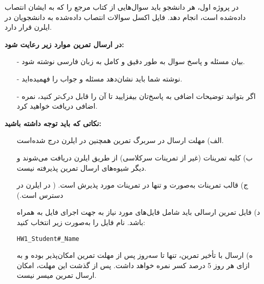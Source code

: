 در پروژه اول، هر دانشجو باید سوال‌هایی از کتاب مرجع را که به ایشان انتصاب داده‌شده است، انجام دهد. فایل اکسل سوالات انتصاب داده‌شده به دانشجویان در ایلرن قرار دارد.

\textbf{در ارسال تمرین موارد زیر رعایت شود:}

\begin{itemize}
	\item[-]
	 بیان مسئله و پاسخ سوال به طور دقیق و کامل به زبان فارسی نوشته شود.

	\item[-]	
	 نوشته شما باید نشان‌دهد مسئله و جواب را فهمیده‌اید.
	
	\item[-]	
	اگر بتوانید توضیحات اضافی به پاسخ‌تان بیفزایید تا آن را قابل‌ درک‌تر کنید، نمره اضافی دریافت خواهید کرد.
\end{itemize}

\textbf{نکاتی که باید توجه داشته باشید:}

\begin{itemize}
	\item[الف)]
	مهلت ارسال در سربرگ تمرین همچنین در ایلرن درج شده‌است.
	\item[ب)]
	کلیه تمرینات (غیر از تمرینات سرکلاسی) از طریق ایلرن دریافت می‌شوند و دیگر شیوه‌های ارسال تمرین پذیرفته نیست.
	\item[ج)]
	قالب تمرینات به‌صورت \lr{\LaTeX} و تنها در  تمرینات مورد پذیرش است. ( در ایلرن در دسترس است.)
	\item[د)]	
	فایل تمرین ارسالی باید شامل فایل‌های مورد نیاز به جهت اجرای فایل \lr{\LaTeX} به همراه  باشد. نام فايل را به‌صورت زير انتخاب كنيد:

\begin{latin} \begin{center}
		\texttt{HW1\_Student\#\_Name}
	\end{center}
\end{latin}

	\item[ه)]
	ارسال با تأخیر تمرین، تنها تا سه‌روز پس از مهلت تمرین امکان‌پذیر بوده و به ازای هر روز 5 درصد کسر نمره خواهد داشت. پس از گذشت این مهلت، امکان ارسال تمرین میسر نیست.
\end{itemize}
